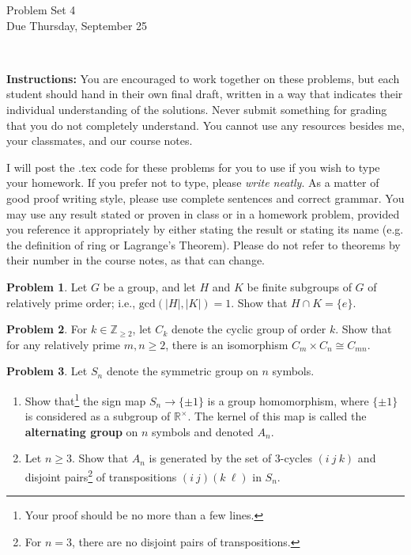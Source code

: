 \documentclass[11pt]{article}
\title{}
\date{\vspace{-0.5in}}
\theoremstyle{definition}
\newtheorem{problem}{Problem}
\begin{document}
\thispagestyle{fancy}
\pagestyle{fancy}

\vspace{3em}

\begin{center}
	{\LARGE Problem Set 4 \\}
	Due Thursday, September 25
\end{center}

\

\noindent
{\bf Instructions:}
You are encouraged to work together on these problems, but each student should hand in their own final draft, written in a way that indicates their individual understanding of the solutions. Never submit something for grading that you do not completely understand. You cannot use any resources besides me, your classmates, and our course notes.


I will post the .tex code for these problems for you to use if you wish to type your homework. If you prefer not to type, please  {\em write neatly}. As a matter of good proof writing style, please use complete sentences and correct grammar. You may use any result stated or proven in class or in a homework problem, provided you reference it appropriately by either stating the result or stating its name (e.g. the definition of ring or Lagrange's Theorem). Please do not refer to theorems by their number in the course notes, as that can change.


\smallskip



\begin{problem} 
Let $G$ be a group, and let $H$ and $K$ be finite subgroups of $G$ of relatively prime order; i.e., $\mathrm{gcd}(|H|, |K|) = 1$. Show that $H \cap K = \{e\}$.
\end{problem} 

\smallskip


\begin{problem} 
For $k\in \mathbb{Z}_{\geq 2}$, let $C_k$ denote the cyclic group of order $k$. Show that for any relatively prime $m,n\geq 2$, there is an isomorphism $C_m \times C_n \cong C_{mn}$.
\end{problem} 

\smallskip


\begin{problem} 
Let $S_n$ denote the symmetric group on $n$ symbols.
\begin{enumerate}[(3.1)]
\item Show that\footnote{Your proof should be no more than a few lines.} the sign map $S_n \to \{\pm 1\}$ is a group homomorphism, where $\{\pm 1\}$ is considered as a subgroup of $\mathbb{R}^\times$. The kernel of this map is called the \textbf{alternating group} on $n$ symbols and denoted $A_n$.
\item Let $n\geq 3$. Show that $A_n$ is generated by the set of $3$-cycles $(i \ j\ k)$ and disjoint pairs\footnote{For $n=3$, there are no disjoint pairs of transpositions.} of transpositions $(i \ j) (k \ \ell)$ in $S_n$. 
\end{enumerate}
\end{problem} 
\end{document}
